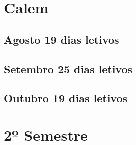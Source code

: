 \documentclass[thesis]{hmcposter}
\begin{document}
\begin{poster}
\section{\color{hmcorange}Calem}\subsection{Agosto \hfill 19 dias letivos}\subsection{Setembro \hfill 25 dias letivos}\subsection{Outubro \hfill 19 dias letivos}\vfill\null
\columnbreak
\section{\hfill \color{hmcorange}2º Semestre}

\end{poster}
\end{document}
